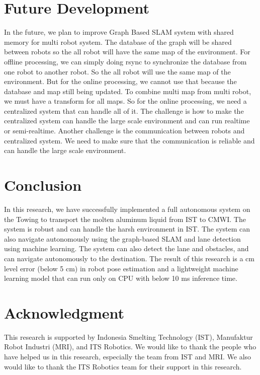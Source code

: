 \documentclass[conference, a4paper]{IEEEtran}[2015/08/26]
\begin{document}

\section{Future Development}
In the future, we plan to improve Graph Based SLAM system with shared memory for multi robot system. The database of the graph will be shared between robots so the all robot will have the same map of the environment. For offline processing, we can simply doing rsync to synchronize the database from one robot to another robot. So the all robot will use the same map of the environment. But for the online processing, we cannot use that because the database and map still being updated. To combine multi map from multi robot, we must have a transform for all maps. So for the online processing, we need a centralized system that can handle all of it. The challenge is how to make the centralized system can handle the large scale environment and can run realtime or semi-realtime. Another challenge is the communication between robots and centralized system. We need to make sure that the communication is reliable and can handle the large scale environment.

\section{Conclusion} 
In this research, we have successfully implemented a full autonomous system on the Towing to transport the molten aluminum liquid from IST to CMWI. The system is robust and can handle the harsh environment in IST. The system can also navigate autonomously using the graph-based SLAM and lane detection using machine learning. The system can also detect the lane and obstacles, and can navigate autonomously to the destination. The result of this research is a cm level error (below 5 cm) in robot pose estimation and a lightweight machine learning model that can run only on CPU with below 10 ms inference time. 


\section{Acknowledgment}
This research is supported by Indonesia Smelting Technology (IST), Manufaktur Robot Industri (MRI), and ITS Robotics. We would like to thank the people who have helped us in this research, especially the team from IST and MRI. We also would like to thank the ITS Robotics team for their support in this research. 





\end{document}
